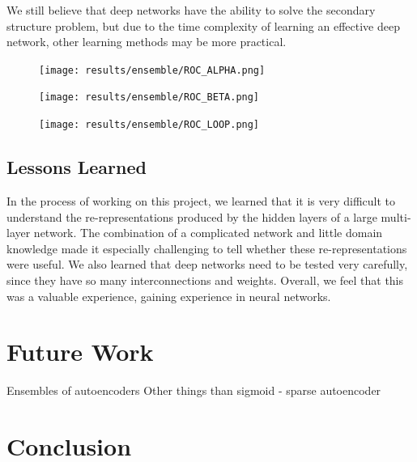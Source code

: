 \documentclass[letterpaper,twocolumn,12pt]{article}
\begin{document}
We still believe that deep networks have the ability to solve the secondary structure problem, but due to the time complexity of learning an effective deep network, other learning methods may be more practical.

\begin{figure}[ht!]
\centering
\texttt{[image: results/ensemble/ROC\_ALPHA.png]}
\caption{}
\label{fig:roc_alpha}
\end{figure}

\begin{figure}[ht!]
\centering
\texttt{[image: results/ensemble/ROC\_BETA.png]}
\caption{}
\label{fig:roc_beta}
\end{figure}

\begin{figure}[ht!]
\centering
\texttt{[image: results/ensemble/ROC\_LOOP.png]}
\caption{}
\label{fig:roc_loop}
\end{figure}


\subsection{Lessons Learned}
In the process of working on this project, we learned that it is very difficult to understand the re-representations produced by the hidden layers of a large multi-layer network.
The combination of a complicated network and little domain knowledge made it especially challenging to tell whether these re-representations were useful.
We also learned that deep networks need to be tested very carefully, since they have so many interconnections and weights.
Overall, we feel that this was a valuable experience, gaining experience in neural networks.

\section{Future Work}
Ensembles of autoencoders
Other things than sigmoid
- sparse autoencoder 

\section{Conclusion}

\end{document}
